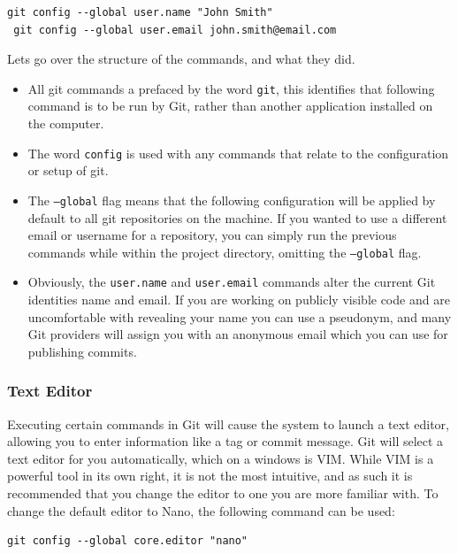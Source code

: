 \documentclass[11pt, a4paper, titlepage]{article}
\begin{document}
\begin{lstlisting}[label=lst_config_user,
caption=Updating the default Git identity]
 git config --global user.name "John Smith"
 git config --global user.email john.smith@email.com
\end{lstlisting}

\noindent
Lets go over the structure of the commands, and what they did.

\begin {itemize}
\item
All git commands a prefaced by the word {\tt git}, this identifies that
following command is to be run by Git, rather than another application
installed on the computer.
\item
The word {\tt config} is used with any commands that relate to the
configuration or setup of git.
\item
The {\tt --global} flag means that the following configuration will be applied
by default to all git repositories on the machine.
If you wanted to use a different email or username for a repository, you can
simply run the previous commands while within the project directory, omitting
the {\tt --global} flag.
\item
Obviously, the {\tt user.name} and {\tt user.email} commands alter the current
Git identities name and email.
If you are working on publicly visible code and are uncomfortable with
revealing your name you can use a pseudonym, and many Git providers will
assign you with an anonymous email which you can use for publishing commits.
\end{itemize}


\subsubsection{Text Editor}
Executing certain commands in Git will cause the system to launch a text
editor, allowing you to enter information like a tag or commit message.
Git will select a text editor for you automatically, which on a windows is VIM.
While VIM is a powerful tool in its own right, it is not the most intuitive,
and as such it is recommended that you change the editor to one you are more
familiar with.
To change the default editor to Nano, the following command can be used:

\begin{lstlisting}[label=lst_config_nano,
caption=Updating the defualt Git editor to Nano]
 git config --global core.editor "nano"
\end{lstlisting}
\end{document}
